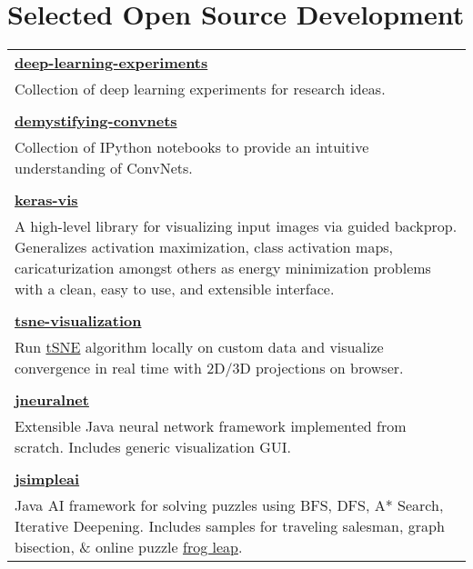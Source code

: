 \documentclass[a4paper,11pt]{article}
\begin{document}
\section{Selected Open Source Development}
\begin{longtable}[l]{l}
\textbf{\href{https://github.com/raghakot/deep-learning-experiments}{deep-learning-experiments}} \\
\footnotesize{ \begin{minipage}[t]{12.5cm} Collection of deep learning experiments for research ideas.
\end{minipage}}
\\
 \multicolumn{1}{l}{}
\\
\textbf{\href{https://github.com/raghakot/demystifying-convnets}{demystifying-convnets}} \\
\footnotesize{ \begin{minipage}[t]{12.5cm} Collection of IPython notebooks to provide an intuitive understanding of ConvNets.
\end{minipage}}
\\
 \multicolumn{1}{l}{}
\\
\textbf{\href{https://github.com/raghakot/keras-vis}{keras-vis}} \\
\footnotesize{ \begin{minipage}[t]{12.5cm} A high-level library for visualizing input images via guided backprop. Generalizes activation maximization, class activation maps, caricaturization amongst others as energy minimization problems with a clean, easy to use, and extensible interface.
\end{minipage}}
\\
 \multicolumn{1}{l}{}
\\
\textbf{\href{https://github.com/raghakot/tsne-visualization}{tsne-visualization}} \\
\footnotesize{ \begin{minipage}[t]{12.5cm} Run \href{https://lvdmaaten.github.io/tsne/}{tSNE} algorithm locally on custom data and visualize convergence in real time with 2D/3D projections on browser.
\end{minipage}}
\\
 \multicolumn{1}{l}{}
\\
\textbf{\href{https://github.com/raghakot/jneuralnet}{jneuralnet}} \\
\footnotesize{ \begin{minipage}[t]{12.5cm} Extensible Java neural network framework implemented from scratch. Includes generic visualization GUI.
\end{minipage}}
\\
 \multicolumn{1}{l}{}
\\
\textbf{\href{https://github.com/raghakot/jsimpleai}{jsimpleai}} \\
\footnotesize{ \begin{minipage}[t]{12.5cm} Java AI framework for solving puzzles using BFS, DFS, A* Search, Iterative Deepening. Includes samples for traveling salesman, graph bisection, \& online puzzle \href{http://www.justriddlesandmore.com/frogleap.html}{frog leap}.
\end{minipage}} \\
\end{longtable}
\end{document}
